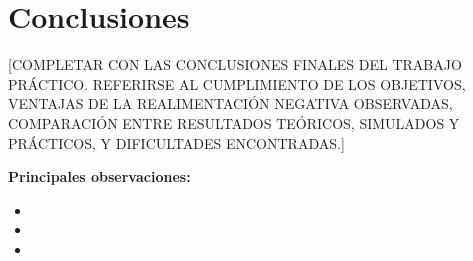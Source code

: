 \chapter{Conclusiones}

[COMPLETAR CON LAS CONCLUSIONES FINALES DEL TRABAJO PRÁCTICO. REFERIRSE AL CUMPLIMIENTO DE LOS OBJETIVOS, VENTAJAS DE LA REALIMENTACIÓN NEGATIVA OBSERVADAS, COMPARACIÓN ENTRE RESULTADOS TEÓRICOS, SIMULADOS Y PRÁCTICOS, Y DIFICULTADES ENCONTRADAS.]

\vspace{1cm}
\noindent\textbf{Principales observaciones:}
\begin{itemize}
    \item [OBSERVACIÓN 1]
    \item [OBSERVACIÓN 2]
    \item [OBSERVACIÓN 3]
\end{itemize}

